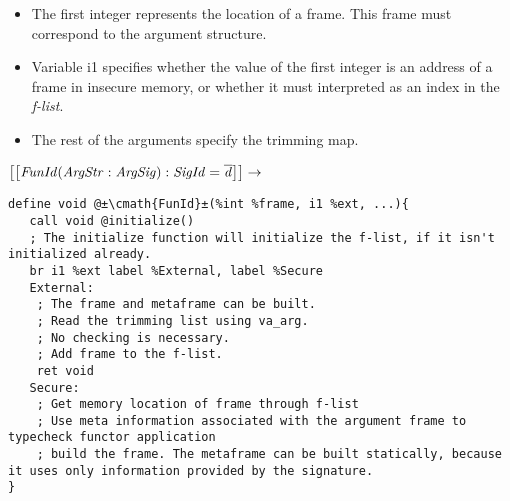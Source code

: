 \begin{itemize}
\item
The first integer represents the location of a frame. 
This frame must correspond to the argument structure.

\item
Variable i1 specifies whether the value of the first integer is an address of a frame in insecure memory, or whether it must interpreted as an index in the \emph{f-list}.

\item
The rest of the arguments specify the trimming map.
\end{itemize}

$\mathit{\left[\left[\mathit{FunId(ArgStr:ArgSig):SigId = \overline{d}}\right]\right]} \rightarrow$

\begin{lstlisting}[language={[x86masm]Assembler}]
define void @±\cmath{FunId}±(%int %frame, i1 %ext, ...){
   call void @initialize()
   ; The initialize function will initialize the f-list, if it isn't initialized already.
   br i1 %ext label %External, label %Secure
   External:
    ; The frame and metaframe can be built.
    ; Read the trimming list using va_arg.
    ; No checking is necessary.
    ; Add frame to the f-list.
    ret void
   Secure:
    ; Get memory location of frame through f-list
    ; Use meta information associated with the argument frame to typecheck functor application
    ; build the frame. The metaframe can be built statically, because it uses only information provided by the signature.
}
\end{lstlisting}

